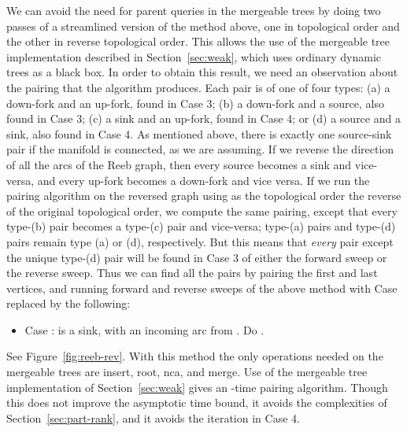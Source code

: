 \documentclass[twoside,leqno,twocolumn]{article}
\begin{document}
We can avoid the need for parent queries in the mergeable trees by doing two passes of a streamlined version of the method above, one in topological order and the other in reverse topological order.  This allows the use of the mergeable tree implementation described in Section~\ref{sec:weak}, which uses ordinary dynamic trees as a black box.  In order to obtain this result, we need an observation about the pairing that the algorithm produces.  Each pair is of one of four types: (a) a down-fork and an up-fork, found in Case 3; (b) a down-fork and a source, also found in Case 3; (c) a sink and an up-fork, found in Case 4; or (d) a source and a sink, also found in Case 4.  As mentioned above, there is exactly one source-sink pair if the manifold is connected, as we are assuming. If we reverse the direction of all the arcs of the Reeb graph, then every source becomes a sink and vice-versa, and every up-fork becomes a down-fork and vice versa.  If we run the pairing algorithm on the reversed graph using as the topological order the reverse of the original topological order, we compute the same pairing, except that every type-(b) pair becomes a type-(c) pair and vice-versa; type-(a) pairs and type-(d) pairs remain type (a) or (d), respectively.  But this means that \emph{every} pair except the unique type-(d) pair will be found in Case 3 of either the forward sweep or the reverse sweep.  Thus we can find all the pairs by pairing the first and last vertices, and running forward and reverse sweeps of the above method with Case  replaced by the following:
\begin{itemize}
\item Case :  is a sink, with an incoming arc from . Do .
\end{itemize}
See Figure~\ref{fig:reeb-rev}. With this method the only operations needed on the mergeable trees are insert, root, nca, and merge.  Use of the mergeable tree implementation of Section~\ref{sec:weak} gives an -time pairing algorithm.  Though this does not improve the asymptotic time bound, it avoids the complexities of Section~\ref{sec:part-rank}, and it avoids the iteration in Case 4.
\end{document}
